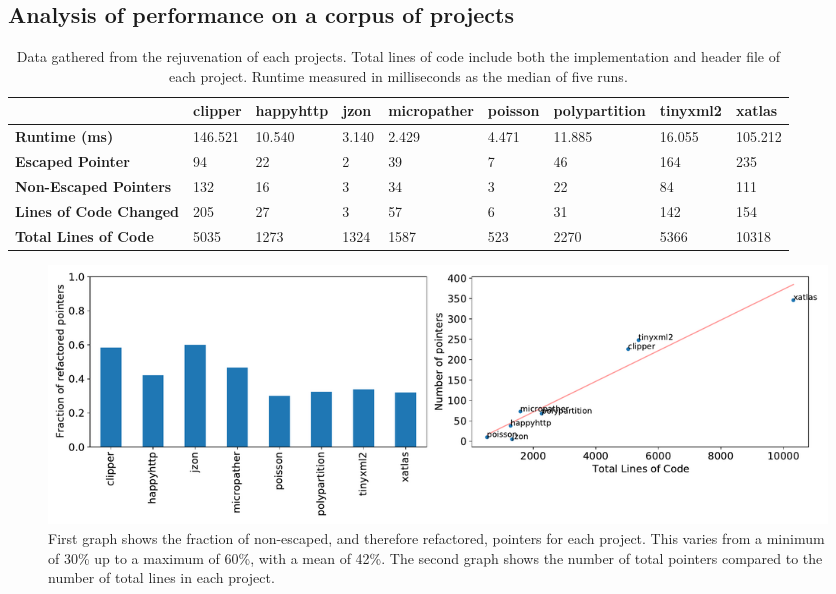 \documentclass{mpaper}
\begin{document}
    \subsection{Analysis of performance on a corpus of projects}
    
    \begin{table}
        \begin{tabular}{|l|l|l|l|l|l|l|l|l|}
        \hline
                                        & \textbf{clipper} & \textbf{happyhttp} & \textbf{jzon} & \textbf{micropather} & \textbf{poisson} & \textbf{polypartition} & \textbf{tinyxml2} & \textbf{xatlas} \\ \hline \hline
        \textbf{Runtime (ms)}          & 146.521          & 10.540             & 3.140                & 2.429         & 4.471            & 11.885                 & 16.055            & 105.212         \\ \hline
        \textbf{Escaped Pointer}       & 94               & 22                 & 2                    & 39            & 7                & 46                     & 164               & 235             \\ \hline
        \textbf{Non-Escaped Pointers}  & 132              & 16                 & 3                    & 34            & 3                & 22                     & 84                & 111             \\ \hline
        \textbf{Lines of Code Changed}   & 205             & 27                 & 3                    & 57            & 6                & 31                     & 142               & 154             \\ \hline
        \textbf{Total Lines of Code} & 5035             & 1273               & 1324                 & 1587          & 523              & 2270                   & 5366              & 10318           \\ \hline
        \end{tabular}    
        \caption{Data gathered from the rejuvenation of each projects. Total lines of code include both the implementation and header file of each project. Runtime measured in milliseconds as the median of five runs.}
        \label{table:data}
    \end{table}
    
    \begin{figure}
        \centering
        \includegraphics[scale=0.45]{images/pointers.pdf}
        \caption{First graph shows the fraction of non-escaped, and therefore refactored, pointers for each project. This varies from a minimum of 30\% up to a maximum of 60\%, with a mean of 42\%. The second graph shows the number of total pointers compared to the number of total lines in each project.}
        \label{fig:ratio-pointer}
    \end{figure}
    
\end{document}
